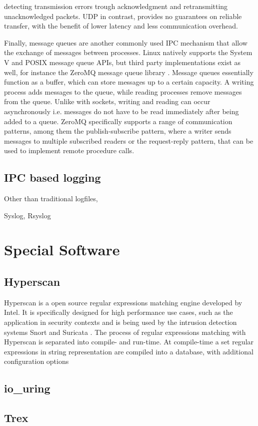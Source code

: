 detecting transmission errors trough acknowledgment and retransmitting unacknowledged packets. \ac{UDP} in contrast, provides no guarantees on reliable transfer, with the benefit of lower latency and less communication overhead. \cite[p.29ff.]{stevens1998sock}
\par
Finally, message queues are another commonly used \ac{IPC} mechanism that allow the exchange of messages between processes. Linux natively supports the System V \cite{systemvshm} and POSIX \cite{posixmsq} message queue APIs, but third party
implementations exist as well, for instance the ZeroMQ message queue library \cite{zeromq}. Message queues essentially function as a buffer, which can store messages up to a certain capacity. A writing process adds messages to the queue, while
reading processes remove messages from the queue. Unlike with sockets, writing and reading can occur asynchronously i.e. messages do not have to be read immediately after being added to a queue. ZeroMQ specifically supports a range of communication 
patterns, among them the publish-subscribe pattern, where a writer sends messages to multiple subscribed readers or the request-reply pattern, that can be used to implement remote procedure calls.         

\subsection{IPC based logging}

Other than traditional logfiles, 

Syslog, Rsyslog

\section{Special Software}
\label{sec:softwar}

\subsection{Hyperscan}
\label{sec:hyperscan}

Hyperscan is a open source regular expressions matching engine developed by Intel. 
It is specifically designed for high performance use cases, such as the application in security contexts and is being used by the intrusion detection systems Snort and Suricata \cite{hyperscan}.  
The process of regular expressions matching with Hyperscan is separated into compile- and run-time. At compile-time a set regular expressions in string representation are compiled into a 
database, with additional configuration options  

\subsection{io\_uring}
\label{sec:io_uring}

\subsection{Trex}
\label{sec:trex}
